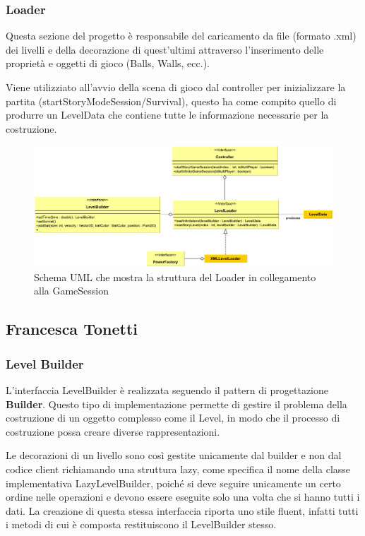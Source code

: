 \documentclass[a4paper,12pt]{report}
\begin{document}
\subsubsection*{Loader}
Questa sezione del progetto è responsabile del caricamento da file (formato .xml) dei livelli e della decorazione di quest'ultimi attraverso l'inserimento delle proprietà e oggetti di gioco (Balls, Walls, ecc.).

Viene utilizziato all'avvio della scena di gioco dal controller per inizializzare la partita (startStoryModeSession/Survival), questo ha come compito quello di produrre un LevelData che contiene tutte le informazione necessarie per la costruzione.
\begin{figure}[H]
\includegraphics[width=\linewidth]{img/loader}
\caption{Schema UML che mostra la struttura del Loader in collegamento alla GameSession}
\label{img:loader}
\end{figure}


\subsection*{Francesca Tonetti}
\subsubsection*{Level Builder}
L'interfaccia LevelBuilder è realizzata seguendo il pattern di progettazione \textbf{Builder}.
Questo tipo di implementazione permette di gestire il problema della costruzione di un oggetto complesso come il Level, in modo che il processo di costruzione possa creare diverse rappresentazioni.

Le decorazioni di un livello sono così gestite unicamente dal builder e non dal codice client richiamando una struttura lazy, come specifica il nome della classe implementativa LazyLevelBuilder, poiché si deve seguire unicamente un certo ordine nelle operazioni e devono essere eseguite solo una volta che si hanno tutti i dati. 
La creazione di questa stessa interfaccia riporta uno stile fluent, infatti tutti i metodi di cui è composta restituiscono il LevelBuilder stesso.
\end{document}
